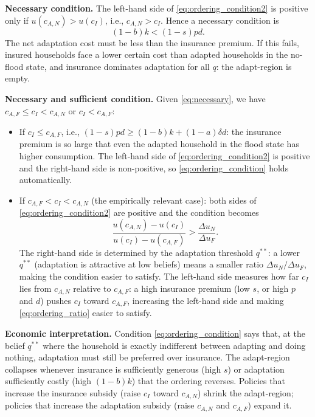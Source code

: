 \documentclass{article}
\begin{document}
\textbf{Necessary condition.} The left-hand side of \eqref{eq:ordering_condition2} is positive only if $u(c_{A,N}) > u(c_I)$, i.e., $c_{A,N} > c_I$. Hence a necessary condition is
\begin{equation}
    (1-b)k < (1-s)pd. \label{eq:necessary}
\end{equation}
The net adaptation cost must be less than the insurance premium. If this fails, insured households face a lower certain cost than adapted households in the no-flood state, and insurance dominates adaptation for all $q$: the adapt-region is empty.

\textbf{Necessary and sufficient condition.} Given \eqref{eq:necessary}, we have $c_{A,F} \leq c_I < c_{A,N}$ or $c_I < c_{A,F}$:
\begin{itemize}
    \item If $c_I \leq c_{A,F}$, i.e., $(1-s)pd \geq (1-b)k + (1-a)\delta d$: the insurance premium is so large that even the adapted household in the flood state has higher consumption. The left-hand side of \eqref{eq:ordering_condition2} is positive and the right-hand side is non-positive, so \eqref{eq:ordering_condition} holds automatically.
    \item If $c_{A,F} < c_I < c_{A,N}$ (the empirically relevant case): both sides of \eqref{eq:ordering_condition2} are positive and the condition becomes
    \begin{equation}
        \frac{u(c_{A,N})-u(c_I)}{u(c_I)-u(c_{A,F})} > \frac{\Delta u_N}{\Delta u_F}. \label{eq:ordering_ratio}
    \end{equation}
    The right-hand side is determined by the adaptation threshold $q^{**}$: a lower $q^{**}$ (adaptation is attractive at low beliefs) means a smaller ratio $\Delta u_N/\Delta u_F$, making the condition easier to satisfy. The left-hand side measures how far $c_I$ lies from $c_{A,N}$ relative to $c_{A,F}$: a high insurance premium (low $s$, or high $p$ and $d$) pushes $c_I$ toward $c_{A,F}$, increasing the left-hand side and making \eqref{eq:ordering_ratio} easier to satisfy.
\end{itemize}

\textbf{Economic interpretation.} Condition \eqref{eq:ordering_condition} says that, at the belief $q^{**}$ where the household is exactly indifferent between adapting and doing nothing, adaptation must still be preferred over insurance. The adapt-region collapses whenever insurance is sufficiently generous (high $s$) or adaptation sufficiently costly (high $(1-b)k$) that the ordering reverses. Policies that increase the insurance subsidy (raise $c_I$ toward $c_{A,N}$) shrink the adapt-region; policies that increase the adaptation subsidy (raise $c_{A,N}$ and $c_{A,F}$) expand it.
\end{document}

